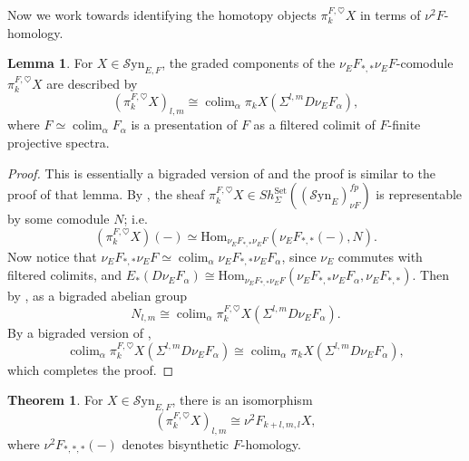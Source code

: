 \documentclass[10pt]{amsart}
\theoremstyle{definition}
\numberwithin{figure}{section}
\numberwithin{equation}{section}
\newtheorem{theorem}[figure]{Theorem}
\newtheorem{lemma}[figure]{Lemma}
\theoremstyle{cited}
\newcommand{\colim}{\operatorname{colim}}
\newcommand{\Hom}{\mathrm{Hom}}
\newcommand{\Syn}{\mathcal{S}\mathrm{yn}}
\begin{document}
Now we work towards identifying the homotopy objects $\pi_k^{F,\heartsuit}X$ in terms of $\nu^2F$-homology.

\begin{lemma}
\label{F_dual_tstruct_lemma}
    For $X\in\Syn_{E,F}$, the graded components of the $\nu_EF_{*,*}\nu_EF$-comodule $\pi_k^{F,\heartsuit}X$ are described by
    $$
(\pi_k^{F,\heartsuit}X)_{l,m} \cong \colim_\alpha \pi_kX(\Sigma^{l,m}D\nu_E F_\alpha),
    $$
    where $F\simeq \colim_\alpha F_\alpha$ is a presentation of $F$ as a filtered colimit of $F$-finite projective spectra.
\end{lemma}

\begin{proof}
    This is essentially a bigraded version of \cite[Lemma 4.17]{Pst22} and the proof is similar to the proof of that lemma. By \cite[Thm. 2.58]{Pst22}, the sheaf $\pi_k^{F,\heartsuit}X\in Sh_{\Sigma}^{\mathrm{Set}}((\Syn_E)_{\nu F}^{fp})$ is representable by some comodule $N$; i.e. $$(\pi_k^{F,\heartsuit}X)(-)\simeq \Hom_{\nu_EF_{*,*}\nu_EF}(\nu_EF_{*,*}(-),N).$$
    Now notice that $\nu_EF_{*,*}\nu_EF\simeq \colim_\alpha \nu_EF_{*,*}\nu_EF_\alpha$, since $\nu_E$ commutes with filtered colimits, and $E_*(D\nu_EF_\alpha)\cong\Hom_{\nu_EF_{*,*}\nu_EF}(\nu_EF_{*,*}\nu_EF_\alpha,\nu_EF_{*,*})$. Then by \cite[Lemma 3.3]{Pst22}, as a bigraded abelian group
    $$
N_{l,m}\cong \colim_\alpha \pi_k^{F,\heartsuit}X(\Sigma^{l,m}D\nu_EF_\alpha).
    $$
    By a bigraded version of \cite[Lemma 3.25]{Pst22},
    $$
\colim_{\alpha}\pi_k^{F,\heartsuit}X(\Sigma^{l,m}D\nu_EF_\alpha)\cong\colim_{\alpha} \pi_kX(\Sigma^{l,m}D\nu_EF_\alpha),
    $$
    which completes the proof.
\end{proof}

\begin{theorem}
\label{F_homol_tstruct_theorem}
    For $X\in\Syn_{E,F}$, there is an isomorphism
    $$
(\pi_k^{F,\heartsuit}X)_{l,m}\cong\nu^2F_{k+l,m,l}X,
    $$
    where $\nu^2F_{*,*,*}(-)$ denotes bisynthetic $F$-homology.
\end{theorem}
\end{document}
